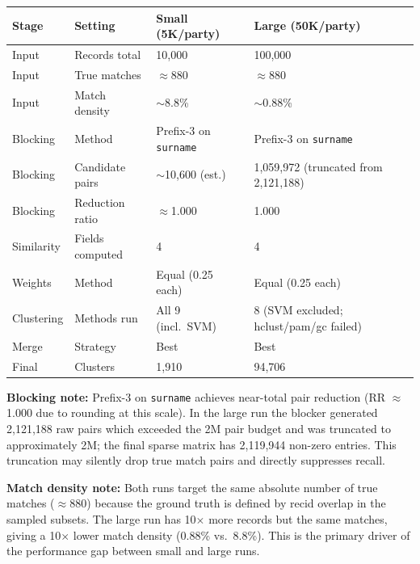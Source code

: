 \documentclass[11pt, a4paper]{article}
\begin{document}
\begin{table}[h!]
\centering
\begin{tabular}{llll}
\toprule
\textbf{Stage} & \textbf{Setting} & \textbf{Small (5K/party)} & \textbf{Large (50K/party)} \\
\midrule
Input       & Records total       & 10,000      & 100,000 \\
Input       & True matches        & $\approx$880 & $\approx$880 \\
Input       & Match density       & $\sim$8.8\% & $\sim$0.88\% \\
Blocking    & Method              & Prefix-3 on \texttt{surname} & Prefix-3 on \texttt{surname} \\
Blocking    & Candidate pairs     & $\sim$10,600 (est.) & 1,059,972 (truncated from 2,121,188) \\
Blocking    & Reduction ratio     & $\approx$1.000 & 1.000 \\
Similarity  & Fields computed     & 4 & 4 \\
Weights     & Method              & Equal (0.25 each) & Equal (0.25 each) \\
Clustering  & Methods run         & All 9 (incl.\ SVM) & 8 (SVM excluded; hclust/pam/gc failed) \\
Merge       & Strategy            & Best & Best \\
Final       & Clusters            & 1,910 & 94,706 \\
\bottomrule
\end{tabular}
\end{table}

\textbf{Blocking note:} Prefix-3 on \texttt{surname} achieves near-total pair
reduction (RR $\approx$ 1.000 due to rounding at this scale). In the large run
the blocker generated 2,121,188 raw pairs which exceeded the 2M pair budget and
was truncated to approximately 2M; the final sparse matrix has 2,119,944
non-zero entries. This truncation may silently drop true match pairs and
directly suppresses recall.

\textbf{Match density note:} Both runs target the same absolute number of true
matches ($\approx$880) because the ground truth is defined by recid overlap in
the sampled subsets. The large run has 10$\times$ more records but the same
matches, giving a 10$\times$ lower match density (0.88\% vs.\ 8.8\%). This
is the primary driver of the performance gap between small and large runs.

\end{document}
